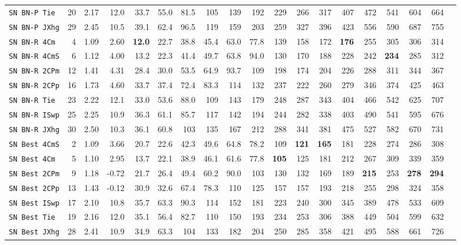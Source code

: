 \begin{tabular}{l | r @{~~} r | r@{~~}r@{~~}r@{~~}r@{~~}r@{~~}r@{~~}r@{~~}r@{~~}r@{~~}r@{~~}r@{~~}r@{~~}r@{~~}r@{~~}r@{~~}r|}
\verb+SN BN-P Tie + & 20 & 2.17 & 12.0&33.7&55.0&81.5&105&139&192&229&266&317&407&472&541&604&664\\
\verb+SN BN-P JXhg+ & 29 & 2.45 & 10.5&39.1&62.4&96.5&119&159&203&259&327&396&423&556&590&687&755\smallskip \\
\verb+SN BN-R 4Cm + & 4 & 1.09 & 2.60&\textbf{12.0}&22.7&38.8&45.4&63.0&77.8&139&158&172&\textbf{176}&255&305&306&314\\
\verb+SN BN-R 4CmS+ & 6 & 1.12 & 4.00&13.2&22.3&41.4&49.7&63.8&94.0&130&170&188&228&242&\textbf{234}&285&312\\
\verb+SN BN-R 2CPm+ & 12 & 1.41 & 4.31&28.4&30.0&53.5&64.9&93.7&109&198&174&204&226&288&311&344&367\\
\verb+SN BN-R 2CPp+ & 16 & 1.73 & 4.60&33.7&37.4&72.4&83.3&114&132&237&222&260&279&346&374&425&463\\
\verb+SN BN-R Tie + & 23 & 2.22 & 12.1&33.0&53.6&88.0&109&143&179&248&287&343&404&466&542&625&707\\
\verb+SN BN-R ISwp+ & 25 & 2.25 & 10.9&36.3&61.1&85.7&117&142&194&244&282&338&403&490&541&595&676\\
\verb+SN BN-R JXhg+ & 30 & 2.50 & 10.3&36.1&60.8&103&135&167&212&288&341&381&475&527&582&670&731\smallskip \\
\verb+SN Best 4CmS+ & 2 & 1.09 & 3.66&20.7&22.6&42.3&49.6&64.8&78.2&109&\textbf{121}&\textbf{165}&181&228&274&286&308\\
\verb+SN Best 4Cm + & 5 & 1.10 & 2.95&13.7&22.1&38.9&46.1&61.6&77.8&\textbf{105}&125&181&212&267&309&339&359\\
\verb+SN Best 2CPm+ & 9 & 1.18 & -0.72&21.7&26.4&49.4&60.2&90.0&103&130&132&169&189&\textbf{215}&253&\textbf{278}&\textbf{294}\\
\verb+SN Best 2CPp+ & 13 & 1.43 & -0.12&30.9&32.6&67.4&78.3&110&125&157&157&193&218&255&298&324&358\\
\verb+SN Best ISwp+ & 17 & 2.10 & 10.8&35.7&63.3&90.3&114&152&181&223&240&300&345&389&478&533&609\\
\verb+SN Best Tie + & 19 & 2.16 & 12.0&35.1&56.4&82.7&110&150&193&234&253&306&388&449&504&599&632\\
\verb+SN Best JXhg+ & 28 & 2.41 & 10.9&34.9&63.3&104&133&182&204&250&285&358&421&495&588&661&726\\
\end{tabular}
